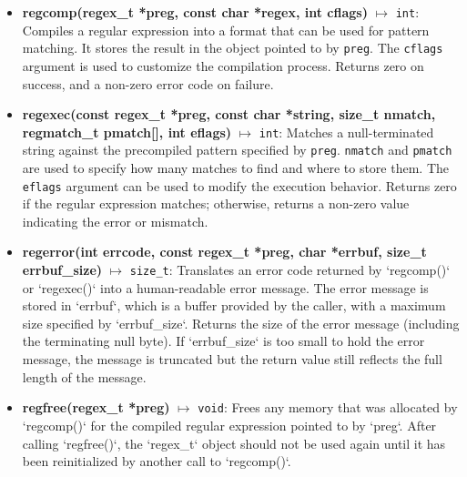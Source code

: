 \documentclass{report}
\begin{document}
    \pagebreak 
    \bigbreak \noindent 
    \begin{itemize}
        \item \textbf{regcomp(regex\_t *preg, const char *regex, int cflags)} $\mapsto$ \texttt{int}: Compiles a regular expression into a format that can be used for pattern matching. It stores the result in the object pointed to by \texttt{preg}. The \texttt{cflags} argument is used to customize the compilation process. Returns zero on success, and a non-zero error code on failure.
        \item \textbf{regexec(const regex\_t *preg, const char *string, size\_t nmatch, regmatch\_t pmatch[], int eflags)} $\mapsto$ \texttt{int}: Matches a null-terminated string against the precompiled pattern specified by \texttt{preg}. \texttt{nmatch} and \texttt{pmatch} are used to specify how many matches to find and where to store them. The \texttt{eflags} argument can be used to modify the execution behavior. Returns zero if the regular expression matches; otherwise, returns a non-zero value indicating the error or mismatch.
        \item \textbf{regerror(int errcode, const regex\_t *preg, char *errbuf, size\_t errbuf\_size)} $\mapsto$ \texttt{size\_t}: Translates an error code returned by `regcomp()` or `regexec()` into a human-readable error message. The error message is stored in `errbuf`, which is a buffer provided by the caller, with a maximum size specified by `errbuf\_size`. Returns the size of the error message (including the terminating null byte). If `errbuf\_size` is too small to hold the error message, the message is truncated but the return value still reflects the full length of the message.
        \item \textbf{regfree(regex\_t *preg)} $\mapsto$ \texttt{void}: Frees any memory that was allocated by `regcomp()` for the compiled regular expression pointed to by `preg`. After calling `regfree()`, the `regex\_t` object should not be used again until it has been reinitialized by another call to `regcomp()`.
    \end{itemize}
\end{document}

